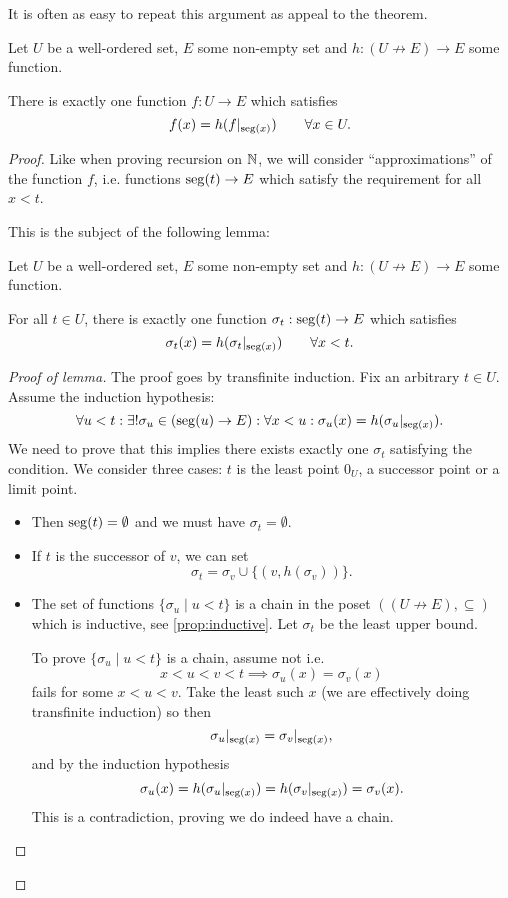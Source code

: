It is often as easy to repeat this argument as appeal to the theorem.

\begin{theorem}
Let $U$ be a well-ordered set, $E$ some non-empty set and $h: (U\not\to E) \to E$ some function.

There is exactly one function $f:U\to E$ which satisfies
\[ f(x) = h(f|_{\operatorname{seg}(x)}) \qquad \forall x\in U. \]
\end{theorem}
\begin{proof}
Like when proving recursion on $\mathbb{N}$, we will consider ``approximations'' of the function $f$, i.e. functions $\operatorname{seg}(t) \to E$ which satisfy the requirement for all $x<t$.

This is the subject of the following lemma:
\begin{lemma*}
Let $U$ be a well-ordered set, $E$ some non-empty set and $h: (U\not\to E) \to E$ some function.

For all $t\in U$, there is exactly one function $\sigma_t:\operatorname{seg}(t)\to E$ which satisfies
\[ \sigma_t(x) = h(\sigma_t|_{\operatorname{seg}(x)}) \qquad \forall x < t. \]
\end{lemma*}
\begin{proof}[Proof of lemma] \renewcommand{\qedsymbol}{$\dashv$ (Lemma)}
The proof goes by transfinite induction. Fix an arbitrary $t\in U$. Assume the induction hypothesis:
\[ \forall u<t: \exists! \sigma_u\in (\operatorname{seg}(u)\to E): \forall x<u: \sigma_u(x) = h(\sigma_u|_{\operatorname{seg}(x)}). \]
We need to prove that this implies there exists exactly one $\sigma_t$ satisfying the condition. We consider three cases: $t$ is the least point $0_U$, a successor point or a limit point.
\begin{itemize}[leftmargin=2.5cm]
\item[\boxed{t = 0_U}] Then $\operatorname{seg}(t) = \emptyset$ and we must have $\sigma_t = \emptyset$.
\item[\boxed{t = S_U(v)}] If $t$ is the successor of $v$, we can set
\[ \sigma_t = \sigma_v\cup\{ (v,h(\sigma_v)) \}. \]
\item[\boxed{t\in \operatorname{Limit}(U)}] The set of functions $\{\sigma_u\;|\; u<t\}$ is a chain in the poset $((U\not\to E),\subseteq)$ which is inductive, see \ref{prop:inductive}. Let $\sigma_t$ be the least upper bound.

To prove $\{\sigma_u\;|\; u<t\}$ is a chain, assume not i.e.
\[ x<u<v<t \implies \sigma_u(x) = \sigma_v(x) \]
fails for some $x<u<v$. Take the least such $x$ (we are effectively doing transfinite induction) so then
\[ \sigma_u|_{\operatorname{seg}(x)} = \sigma_v|_{\operatorname{seg}(x)}, \]
and by the induction hypothesis
\[ \sigma_u(x) = h(\sigma_u|_{\operatorname{seg}(x)}) = h(\sigma_v|_{\operatorname{seg}(x)}) = \sigma_v(x). \]
This is a contradiction, proving we do indeed have a chain.


\end{itemize}
\end{proof}
\end{proof}
